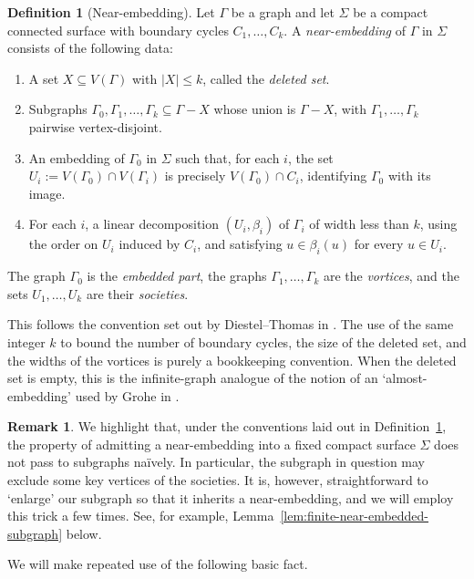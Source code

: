 \documentclass[10pt,a4paper]{amsart}
\theoremstyle{definition}
\newtheorem{definition}[theorem]{Definition}
\newtheorem{remark}[theorem]{Remark}
\begin{document}
\begin{definition}[Near-embedding]\label{def:near-embedding}
Let $\Gamma$ be a graph and let $\Sigma$ be a compact connected surface with boundary cycles $C_1,\ldots,C_k$.
A \emph{near-embedding} of $\Gamma$ in $\Sigma$ consists of the following data:
\begin{enumerate}
\item A set $X\subseteq V(\Gamma)$ with $|X|\leq k$, called the \emph{deleted set}.
\item Subgraphs $\Gamma_0,\Gamma_1,\ldots,\Gamma_k\subseteq\Gamma-X$ whose union is $\Gamma-X$, with $\Gamma_1,\ldots,\Gamma_k$ pairwise vertex-disjoint.
\item An embedding of $\Gamma_0$ in $\Sigma$ such that, for each $i$, the set $U_i:=V(\Gamma_0)\cap V(\Gamma_i)$ is precisely $V(\Gamma_0)\cap C_i$, identifying $\Gamma_0$ with its image.
\item For each $i$, a linear decomposition $(U_i,\beta_i)$ of $\Gamma_i$ of width less than $k$, using the order on $U_i$ induced by $C_i$, and satisfying $u\in\beta_i(u)$ for every $u\in U_i$.
\end{enumerate}
The graph $\Gamma_0$ is the \emph{embedded part}, the graphs $\Gamma_1,\ldots,\Gamma_k$ are the \emph{vortices}, and the sets $U_1,\ldots,U_k$ are their \emph{societies}.
\end{definition}

This follows the convention set out by Diestel--Thomas in \cite{diestel1999excluding}. 
The use of the same integer $k$ to bound the number of boundary cycles, the size of the deleted set, and the widths of the vortices is purely a bookkeeping convention.
When the deleted set is empty, this is the infinite-graph analogue of the notion of an `almost-embedding' used by Grohe in  \cite{Grohe03}.


\begin{remark}
    We highlight that, under the conventions laid out in Definition~\ref{def:near-embedding}, the property of admitting a near-embedding into a fixed compact surface $\Sigma$ does not pass to subgraphs na\"ively. In particular, the subgraph in question may exclude some key vertices of the societies. It is, however, straightforward to `enlarge' our subgraph so that it inherits a near-embedding, and we will employ this trick a few times. See, for example,  Lemma~\ref{lem:finite-near-embedded-subgraph} below.
\end{remark}

We will make repeated use of the following basic fact. 
\end{document}
